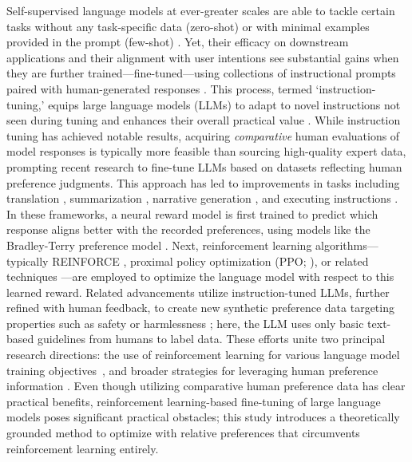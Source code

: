 Self-supervised language models at ever-greater scales are able to tackle certain tasks without any task-specific data (zero-shot) \citep{radford2019language} or with minimal examples provided in the prompt (few-shot) \citep{gpt3,megatron,chowdhery2022palm}. Yet, their efficacy on downstream applications and their alignment with user intentions see substantial gains when they are further trained—fine-tuned—using collections of instructional prompts paired with human-generated responses \citep{mishra-etal-2022-cross,sanh2022multitask,chung2022scaling,thoppilan2022lamda}. This process, termed `instruction-tuning,' equips large language models (LLMs) to adapt to novel instructions not seen during tuning and enhances their overall practical value \citep{chung2022scaling}. While instruction tuning has achieved notable results, acquiring \textit{comparative} human evaluations of model responses is typically more feasible than sourcing high-quality expert data, prompting recent research to fine-tune LLMs based on datasets reflecting human preference judgments. This approach has led to improvements in tasks including translation \citep{kreutzer-etal-2018-reliability}, summarization \citep{stiennon2022learning,ziegler2020finetuning}, narrative generation \citep{ziegler2020finetuning}, and executing instructions \citep{ouyang2022training,ramamurthy2023is}. In these frameworks, a neural reward model is first trained to predict which response aligns better with the recorded preferences, using models like the Bradley-Terry preference model \citep{bradley1952rankanalysis}. Next, reinforcement learning algorithms—typically REINFORCE \citep{williams1992reinforce}, proximal policy optimization (PPO; \cite{schulman2017proximal}), or related techniques \citep{ramamurthy2023is}—are employed to optimize the language model with respect to this learned reward. Related advancements utilize instruction-tuned LLMs, further refined with human feedback, to create new synthetic preference data targeting properties such as safety or harmlessness \citep{bai2022constitutional}; here, the LLM uses only basic text-based guidelines from humans to label data. These efforts unite two principal research directions: the use of reinforcement learning for various language model training objectives~\citep{Ranzato2015SequenceLT,paulus2018a,wu2018learning}, and broader strategies for leveraging human preference information \citep{christiano2017deep,kupcsik2018learning}. Even though utilizing comparative human preference data has clear practical benefits, reinforcement learning-based fine-tuning of large language models poses significant practical obstacles; this study introduces a theoretically grounded method to optimize with relative preferences that circumvents reinforcement learning entirely.

